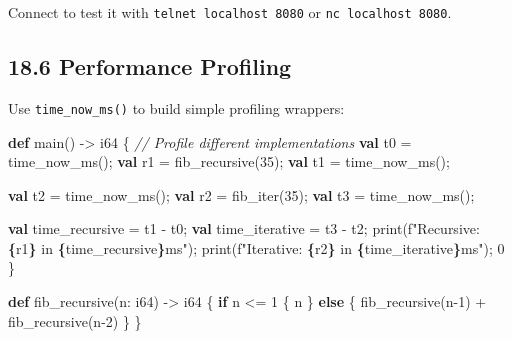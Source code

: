 \documentclass[
  english,
]{book}
\newenvironment{Shaded}{\begin{snugshade}}{\end{snugshade}}
\newcommand{\CommentTok}[1]{\textcolor[rgb]{0.42,0.60,0.33}{\textit{#1}}}
\newcommand{\ControlFlowTok}[1]{\textcolor[rgb]{0.77,0.53,0.75}{\textbf{#1}}}
\newcommand{\DataTypeTok}[1]{\textcolor[rgb]{0.31,0.79,0.69}{#1}}
\newcommand{\DecValTok}[1]{\textcolor[rgb]{0.71,0.81,0.66}{#1}}
\newcommand{\FunctionTok}[1]{\textcolor[rgb]{0.86,0.86,0.67}{#1}}
\newcommand{\KeywordTok}[1]{\textcolor[rgb]{0.34,0.61,0.84}{\textbf{#1}}}
\newcommand{\NormalTok}[1]{\textcolor[rgb]{0.83,0.83,0.83}{#1}}
\newcommand{\OperatorTok}[1]{\textcolor[rgb]{0.83,0.83,0.83}{#1}}
\newcommand{\StringTok}[1]{\textcolor[rgb]{0.81,0.57,0.47}{#1}}
\begin{document}
Connect to test it with \texttt{telnet\ localhost\ 8080} or
\texttt{nc\ localhost\ 8080}.

\subsection{18.6 Performance Profiling}\label{performance-profiling}

Use \texttt{time\_now\_ms()} to build simple profiling wrappers:

\begin{Shaded}
\begin{Highlighting}[]
\KeywordTok{def}\NormalTok{ main() }\OperatorTok{{-}\textgreater{}} \DataTypeTok{i64}\NormalTok{ \{}
    \CommentTok{// Profile different implementations}
    \KeywordTok{val}\NormalTok{ t0 }\OperatorTok{=}\NormalTok{ time\_now\_ms();}
    \KeywordTok{val}\NormalTok{ r1 }\OperatorTok{=}\NormalTok{ fib\_recursive(}\DecValTok{35}\NormalTok{);}
    \KeywordTok{val}\NormalTok{ t1 }\OperatorTok{=}\NormalTok{ time\_now\_ms();}

    \KeywordTok{val}\NormalTok{ t2 }\OperatorTok{=}\NormalTok{ time\_now\_ms();}
    \KeywordTok{val}\NormalTok{ r2 }\OperatorTok{=}\NormalTok{ fib\_iter(}\DecValTok{35}\NormalTok{);}
    \KeywordTok{val}\NormalTok{ t3 }\OperatorTok{=}\NormalTok{ time\_now\_ms();}

    \KeywordTok{val}\NormalTok{ time\_recursive }\OperatorTok{=}\NormalTok{ t1 }\OperatorTok{{-}}\NormalTok{ t0;}
    \KeywordTok{val}\NormalTok{ time\_iterative }\OperatorTok{=}\NormalTok{ t3 }\OperatorTok{{-}}\NormalTok{ t2;}
    \FunctionTok{print}\NormalTok{(}\StringTok{f"Recursive: }\ControlFlowTok{\{}\NormalTok{r1}\ControlFlowTok{\}}\StringTok{ in }\ControlFlowTok{\{}\NormalTok{time\_recursive}\ControlFlowTok{\}}\StringTok{ms"}\NormalTok{);}
    \FunctionTok{print}\NormalTok{(}\StringTok{f"Iterative: }\ControlFlowTok{\{}\NormalTok{r2}\ControlFlowTok{\}}\StringTok{ in }\ControlFlowTok{\{}\NormalTok{time\_iterative}\ControlFlowTok{\}}\StringTok{ms"}\NormalTok{);}
    \DecValTok{0}
\NormalTok{\}}

\KeywordTok{def}\NormalTok{ fib\_recursive(n: }\DataTypeTok{i64}\NormalTok{) }\OperatorTok{{-}\textgreater{}} \DataTypeTok{i64}\NormalTok{ \{}
    \ControlFlowTok{if}\NormalTok{ n }\OperatorTok{\textless{}=} \DecValTok{1}\NormalTok{ \{ n \} }\ControlFlowTok{else}\NormalTok{ \{ fib\_recursive(n}\OperatorTok{{-}}\DecValTok{1}\NormalTok{) }\OperatorTok{+}\NormalTok{ fib\_recursive(n}\OperatorTok{{-}}\DecValTok{2}\NormalTok{) \}}
\NormalTok{\}}


\end{Highlighting}
\end{Shaded}
\end{document}
